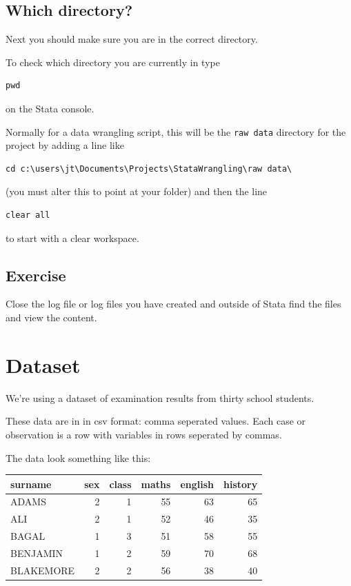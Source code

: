 \documentclass[
]{article}
\begin{document}
\hypertarget{which-directory}{%
\subsection{Which directory?}\label{which-directory}}

Next you should make sure you are in the correct directory.

To check which directory you are currently in type

\begin{verbatim}
pwd
\end{verbatim}

on the Stata console.

Normally for a data wrangling script, this will be the \texttt{raw\ data} directory for the project by adding a line like

\begin{verbatim}
cd c:\users\jt\Documents\Projects\StataWrangling\raw data\
\end{verbatim}

(you must alter this to point at your folder) and then the line

\begin{verbatim}
clear all
\end{verbatim}

to start with a clear workspace.

\hypertarget{exercise-2}{%
\subsection{Exercise}\label{exercise-2}}

Close the log file or log files you have created and outside of Stata find the files and view the content.

\hypertarget{dataset}{%
\section{Dataset}\label{dataset}}

We're using a dataset of examination results from thirty school students.

These data are in in csv format: comma seperated values. Each case or observation is a row with variables in rows seperated by commas.

The data look something like this:

\begin{longtable}[]{@{}lrrrrr@{}}
\toprule
surname & sex & class & maths & english & history \\
\midrule
\endhead
ADAMS & 2 & 1 & 55 & 63 & 65 \\
ALI & 2 & 1 & 52 & 46 & 35 \\
BAGAL & 1 & 3 & 51 & 58 & 55 \\
BENJAMIN & 1 & 2 & 59 & 70 & 68 \\
BLAKEMORE & 2 & 2 & 56 & 38 & 40 \\
\bottomrule
\end{longtable}
\end{document}
